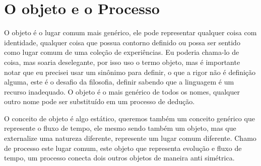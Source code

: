 \documentclass[10pt,a4paper]{report}
\begin{document}


% 



\section{O objeto e o Processo}

\hspace{\baselineskip}

O objeto é o lugar comum mais genérico, ele pode representar qualquer coisa com identidade, qualquer coisa que possua contorno definido ou possa ser sentido como lugar comum de uma coleção de experiências. Eu poderia chama-lo de coisa, mas soaria deselegante, por isso uso o termo objeto, mas é importante notar que eu precisei usar um sinônimo para definir, o que a rigor não é definição alguma, este é o desafio da filosofia, definir sabendo que a linguagem é um recurso inadequado. O objeto é o mais genérico de todos os nomes, qualquer outro nome pode ser substituído em um processo de dedução.

\hspace{\baselineskip}

O conceito de objeto é algo estático, queremos também um conceito genérico que represente o fluxo de tempo, ele mesmo sendo também um objeto, mas que externalize uma natureza diferente, represente um lugar comum diferente. Chamo de processo este lugar comum, este objeto que representa evolução e fluxo de tempo, um processo conecta dois outros objetos de maneira anti simétrica.
\end{document}
